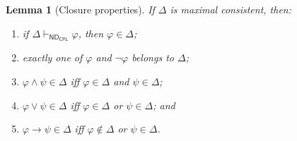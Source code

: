 \documentclass[11pt,oneside,openany]{book}
\theoremstyle{definition}
\theoremstyle{plain}
\newtheorem{lemma}[definition]{Lemma}
\theoremstyle{remark}
\newcommand{\derives}{\vdash}
\newcommand{\ND}{\mathsf{ND}}
\newcommand{\CPL}{\mathsf{CPL}}
\begin{document}
\begin{lemma}[Closure properties]
\label{lem:prop-mcs}
If \(\Delta\) is maximal consistent, then:
\begin{enumerate}
  \item if \(\Delta\derives_{\ND_{\CPL}}\varphi\), then
        \(\varphi\in\Delta\);
  \item exactly one of \(\varphi\) and \(\neg\varphi\) belongs to
        \(\Delta\);
  \item \(\varphi\land\psi\in\Delta\) iff
        \(\varphi\in\Delta\) and \(\psi\in\Delta\);
  \item \(\varphi\lor\psi\in\Delta\) iff
        \(\varphi\in\Delta\) or \(\psi\in\Delta\); and
  \item \(\varphi\to\psi\in\Delta\) iff
        \(\varphi\notin\Delta\) or \(\psi\in\Delta\).
\end{enumerate}
\end{lemma}
\end{document}
